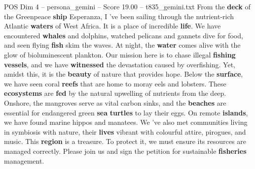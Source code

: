 \begin{textsample}{POS Dim 4 – persona\_gemini – Score 19.00 – t835\_gemini.txt}  \label{ex:f4_pos_042}
From the \textbf{deck} of the Greenpeace \textbf{ship} Esperanza, I ’ve been sailing through the nutrient-rich Atlantic \textbf{waters} of West Africa.
It is a place of incredible \textbf{life}.
We have encountered \textbf{whales} and dolphins, watched pelicans and gannets dive for food, and seen flying \textbf{fish} skim the waves.
At night, the \textbf{water} comes alive with the glow of bioluminescent plankton.
Our mission here is to chase illegal \textbf{fishing} \textbf{vessels}, and we have \textbf{witnessed} the devastation caused by overfishing.
Yet, amidst this, it is the \textbf{beauty} of nature that provides hope.
Below the \textbf{surface}, we have seen coral \textbf{reefs} that are home to moray eels and lobsters.
These \textbf{ecosystems} are \textbf{fed} by the natural upwelling of nutrients from the deep.
Onshore, the mangroves serve as vital carbon sinks, and the \textbf{beaches} are essential for endangered green \textbf{sea} \textbf{turtles} to lay their eggs.
On remote \textbf{islands}, we have found marine hippos and manatees.
We ’ve also met communities living in symbiosis with nature, their \textbf{lives} vibrant with colourful attire, pirogues, and music.
This \textbf{region} is a treasure.
To protect it, we must ensure its resources are managed correctly.
Please join us and sign the petition for sustainable \textbf{fisheries} management.

\end{textsample}
